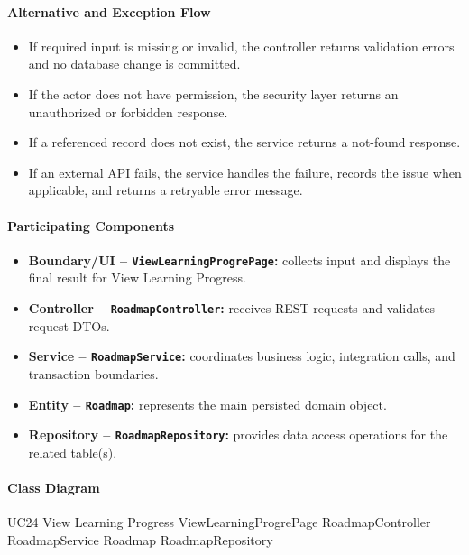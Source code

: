 \paragraph{Alternative and Exception Flow}

\begin{itemize}
    \item If required input is missing or invalid, the controller returns validation errors and no database change is committed.
    \item If the actor does not have permission, the security layer returns an unauthorized or forbidden response.
    \item If a referenced record does not exist, the service returns a not-found response.
    \item If an external API fails, the service handles the failure, records the issue when applicable, and returns a retryable error message.
\end{itemize}

\paragraph{Participating Components}

\begin{itemize}
    \item \textbf{Boundary/UI -- \texttt{ViewLearningProgrePage}:} collects input and displays the final result for View Learning Progress.
    \item \textbf{Controller -- \texttt{RoadmapController}:} receives REST requests and validates request DTOs.
    \item \textbf{Service -- \texttt{RoadmapService}:} coordinates business logic, integration calls, and transaction boundaries.
    \item \textbf{Entity -- \texttt{Roadmap}:} represents the main persisted domain object.
    \item \textbf{Repository -- \texttt{RoadmapRepository}:} provides data access operations for the related table(s).
\end{itemize}

\paragraph{Class Diagram}

\ClassDiagram
{UC24 View Learning Progress}
{ViewLearningProgrePage}
{RoadmapController}
{RoadmapService}
{Roadmap}
{RoadmapRepository}

